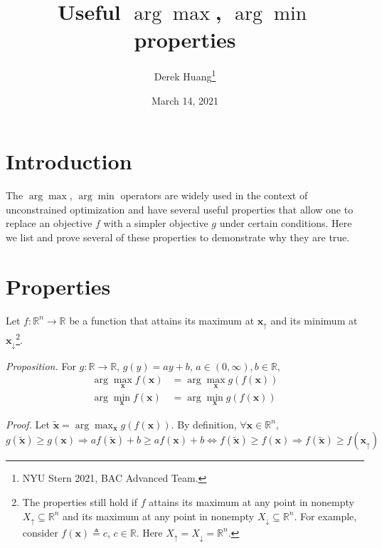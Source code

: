 \documentclass{article}
\title{Useful $ \arg\max $, $ \arg\min $ properties}
\author{Derek Huang\thanks{NYU Stern 2021, BAC Advanced Team.}}
\date{March 14, 2021}
\numberwithin{equation}{section}
\begin{document}
\maketitle
\thispagestyle{fancy}

\section{Introduction}

The $ \arg\max $, $ \arg\min $ operators are widely used in the context of
unconstrained optimization and have several useful properties that allow one
to replace an objective $ f $ with a simpler objective $ g $ under certain
conditions. Here we list and prove several of these properties to demonstrate
why they are true.

\section{Properties}

Let $ f : \mathbb{R}^n \rightarrow \mathbb{R} $ be a function that attains its
maximum at $ \mathbf{x}_\uparrow $ and its minimum at
$ \mathbf{x}_\downarrow $\footnote{
    The properties still hold if $ f $ attains its maximum at any point in
    nonempty $ X_\uparrow \subseteq \mathbb{R}^n $ and its maximum at any point
    in nonempty $ X_\downarrow \subseteq \mathbb{R}^n $. For example, consider
    $ f(\mathbf{x}) \triangleq c $, $ c \in \mathbb{R} $. Here $ X_\uparrow =
    X_\downarrow = \mathbb{R}^n $.
}.

\medskip

\textit{Proposition.} For $ g : \mathbb{R} \rightarrow \mathbb{R} $,
$ g(y) = ay + b $, $ a \in (0, \infty), b \in \mathbb{R} $,
\begin{equation*}
    \begin{split}
        \arg\max_\mathbf{x}f(\mathbf{x}) & =
        \arg\max_\mathbf{x}g(f(\mathbf{x})) \\
        \arg\min_\mathbf{x}f(\mathbf{x}) & =
        \arg\min_\mathbf{x}g(f(\mathbf{x}))
    \end{split}
\end{equation*}

\medskip

\textit{Proof.} Let $ \tilde{\mathbf{x}} =
\arg\max_\mathbf{x}g(f(\mathbf{x})) $. By definition, $ \forall \mathbf{x}
\in \mathbb{R}^n $,
\begin{equation*}
    g(\tilde{\mathbf{x}}) \ge g(\mathbf{x}) \Rightarrow
    af(\tilde{\mathbf{x}}) + b \ge af(\mathbf{x}) + b \Leftrightarrow
    f(\tilde{\mathbf{x}}) \ge f(\mathbf{x}) \Rightarrow
    f(\tilde{\mathbf{x}}) \ge f(\mathbf{x}_\uparrow)
\end{equation*}
\end{document}
